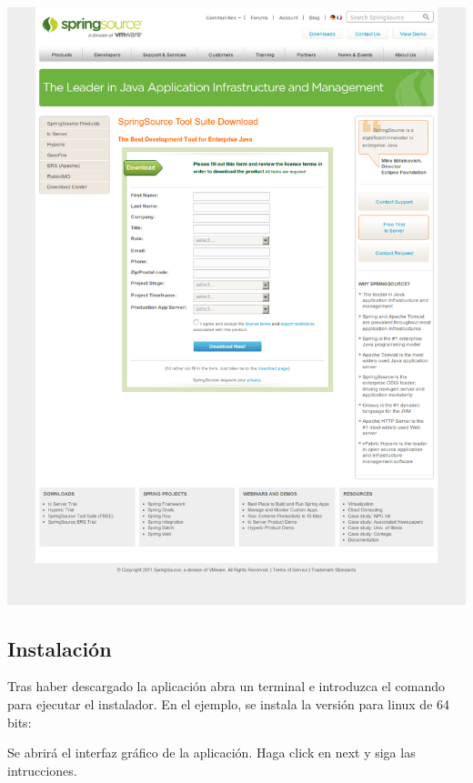 \documentclass[a4paper,12pt,spanish]{article}
\begin{document}
\begin{center}
\includegraphics[scale=0.30]{SpringSourceToolSuiteDownload}
\end{center}

\subsection{Instalación}

Tras haber descargado la aplicación abra un terminal e introduzca el comando para ejecutar el instalador. En el ejemplo, se instala la versión para linux de 64 bits:


Se abrirá el interfaz gráfico de la aplicación. 
Haga click en next y siga las intrucciones. 
\end{document}
